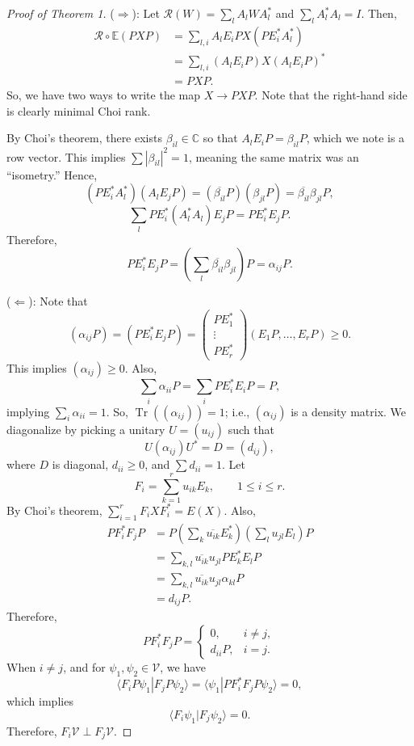 \documentclass[12pt]{article}
\theoremstyle{definition}
\newcommand{\C}{\mathbb{C}}
\begin{document}
\begin{proof}[Proof of Theorem 1]
($\Rightarrow$): Let $\mathcal{R}(W)=\sum_l A_lWA_l^*$ and $\sum_l A_l^*A_l=I$. Then,
\begin{align*}
\mathcal{R} \circ \mathbb{E}(PXP) &= \sum_{l,i} A_lE_iPX(PE_i^*A_l^*) \\
&= \sum_{l,i} (A_lE_iP)X(A_lE_iP)^* \\
&= PXP.
\end{align*}
So, we have two ways to write the map $X \to PXP$. Note that the right-hand
side is clearly minimal Choi rank.

By Choi's theorem, there exists $\beta_{il} \in \C$ so that $A_lE_iP = \beta_{il}P$, which we
note is a row vector. This implies $\sum |\beta_{il}|^2 = 1$, meaning the same matrix was
an ``isometry.'' Hence,
\[
(PE_i^*A_l^*)(A_lE_jP) = (\overline{\beta_{il}}P)(\beta_{jl}P)=\overline{\beta_{il}}\beta_{jl}P,
\]
\[
\sum_l PE_i^*(A_l^*A_l)E_jP = PE_i^*E_jP.
\]
Therefore,
\[
PE_i^*E_jP = \left(\sum_l \overline{\beta_{il}}\beta_{jl}\right)P = \alpha_{ij}P.
\]

($\Leftarrow$): Note that
\[
(\alpha_{ij}P)=(PE_i^*E_jP)=\begin{pmatrix}PE_1^*\\ \vdots \\ PE_r^*\end{pmatrix}(E_1P,\ldots,E_rP) \geq 0.
\]
This implies $(\alpha_{ij}) \geq 0$. Also,
\[
\sum_i \alpha_{ii}P = \sum_i PE_i^*E_iP = P,
\]
implying $\sum_i \alpha_{ii}=1$. So, $\operatorname{Tr}((\alpha_{ij}))=1$; i.e., $(\alpha_{ij})$ is a density matrix. We
diagonalize by picking a unitary $U=(u_{ij})$ such that
\[
U(\alpha_{ij})U^* = D=(d_{ij}),
\]
where $D$ is diagonal, $d_{ii} \geq 0$, and $\sum d_{ii}=1$. Let
\[
F_i = \sum_{k=1}^r u_{ik}E_k, \qquad 1 \leq i \leq r.
\]
By Choi's theorem, $\sum_{i=1}^r F_iXF_i^* = E(X)$. Also,
\begin{align*}
PF_i^*F_jP &= P\left(\sum_k \overline{u_{ik}}E_k^*\right)\left(\sum_l u_{jl}E_l\right)P \\
&= \sum_{k,l} \overline{u_{ik}}u_{jl}PE_k^*E_lP \\
&= \sum_{k,l} \overline{u_{ik}}u_{jl}\alpha_{kl}P \\
&= d_{ij}P.
\end{align*}
Therefore,
\[
PF_i^*F_jP = \begin{cases}
0, & i \neq j,\\
d_{ii}P, & i=j.
\end{cases}
\]
When $i \neq j$, and for $\psi_1,\psi_2 \in \mathcal{V}$, we have
\[
\langle F_iP\psi_1|F_jP\psi_2\rangle = \langle \psi_1|PF_i^*F_jP\psi_2\rangle = 0,
\]
which implies
\[
\langle F_i\psi_1|F_j\psi_2\rangle = 0.
\]
Therefore, $F_i\mathcal{V} \perp F_j\mathcal{V}$.


\end{proof}
\end{document}
